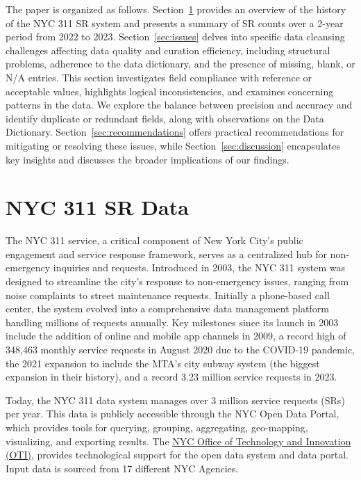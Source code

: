 \documentclass[linenumber]{jdsart}
\begin{document}
The paper is organized as follows. Section~\ref{sec:data} provides 
an overview of the history of the NYC 311 SR system and presents 
a summary of SR counts over a 2-year period from 2022 to 2023. 
Section~\ref{sec:issues} delves into specific data cleansing 
challenges affecting data quality and curation efficiency, 
including structural problems, adherence to the data dictionary, 
and the presence of missing, blank, or N/A entries. This section
 investigates field compliance with reference or acceptable values, 
highlights logical inconsistencies, and examines concerning patterns 
in the data. We explore the balance between precision and accuracy 
and identify duplicate or redundant fields, along with observations 
on the Data Dictionary. Section~\ref{sec:recommendations} offers 
practical recommendations for mitigating or resolving these issues, 
while Section~\ref{sec:discussion} encapsulates key insights and 
discusses the broader implications of our findings.


\section{NYC 311 SR Data} 
\label{sec:data}
The NYC 311 service, a critical component of New York City's public
engagement and service response framework, serves as a centralized hub
for non-emergency inquiries and requests. Introduced in 2003, the NYC
311 system was designed to streamline the city's response to
non-emergency issues, ranging from noise complaints to street
maintenance requests. Initially a phone-based call center, the system
evolved into a comprehensive data management platform handling
millions of requests annually. Key milestones since its launch in 2003
include the addition of online and mobile app channels in 2009, a
record high of 348,463 monthly service requests in August 2020 due to
the COVID-19 pandemic, the 2021 expansion to include the MTA's city
subway system (the biggest expansion in their history), and a 
record 3.23 million service requests in 2023. 


Today, the NYC 311 data system manages over 3 million service
requests (SRs) per year. This data is publicly accessible through the NYC Open Data
Portal, which provides tools for querying, grouping, aggregating,
geo-mapping, visualizing, and exporting results. The
\href{https://www.nyc.gov/content/oti/pages/}{NYC Office of Technology
  and Innovation (OTI)}, provides technological support for the
open data system and data portal. Input data is sourced from 17 different
NYC Agencies. 
\end{document}
